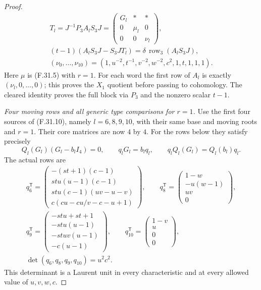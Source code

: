 \begin{proof}
\[\begin{gathered}
 T_l=J^{-1}P_3A_lS_3J=
 \begin{pmatrix}G_l&*\;&*\\0&\mu_l&0\\0&0&\nu_l\end{pmatrix},\\
 (t-1)(A_lS_3J-S_3JT_l)
     =\delta\,\operatorname{row}_3(A_lS_3J),\\
 (\nu_0,\ldots,\nu_{10})=
 (1,u^{-2},t^{-1},v^{-2},w^{-2},c^2,1,t,1,1,1).
 \end{gathered}                                                \tag{F.31.20}
\]
Here $\mu$ is (F.31.5) with $r=1$.
For each word the first row of $A_l$
is exactly $(\nu_l,0,\ldots,0)$;
this proves the $X_1$ quotient before
passing to cohomology. The cleared
identity proves the full block via
$P_3$ and the nonzero scalar $t-1$.

\emph{Four moving rows and all generic type comparisons for $r=1$.}
Use the first four sources of (F.31.10),
namely $l=6,8,9,10$, with their same
base and moving roots and $r=1$.
Their core matrices are now $4$ by $4$.
For the rows below they satisfy precisely
\[
 Q_l(G_l)(G_l-b_lI_4)=0,\qquad
 q_lG_l=b_lq_l,\qquad q_lQ_l(G_l)=Q_l(b_l)q_l.
                                                               \tag{F.31.21}
\]
The actual rows are
\[
 \begin{gathered}
 q_6^{\mathsf T}=
 \begin{pmatrix}
 -(st+1)(c-1)\\stu(u-1)(c-1)\\
 stu(c-1)(uv-u-v)\\c(cu-cu/v-c-u+1)
 \end{pmatrix},\qquad
 q_8^{\mathsf T}=
 \begin{pmatrix}1-w\\-u(w-1)\\uv\\0\end{pmatrix},\\
 q_9^{\mathsf T}=
 \begin{pmatrix}-stu+st+1\\-stu(u-1)\\-stuv(u-1)\\-c(u-1)\end{pmatrix},\qquad
 q_{10}^{\mathsf T}=
 \begin{pmatrix}1-v\\u\\0\\0\end{pmatrix},\\
              \det(q_6,q_8,q_9,q_{10})=u^2c^2.
 \end{gathered}                                                \tag{F.31.22}
\]
This determinant is a Laurent unit in
every characteristic and at every allowed
value of $u,v,w,c$.


\end{proof}
